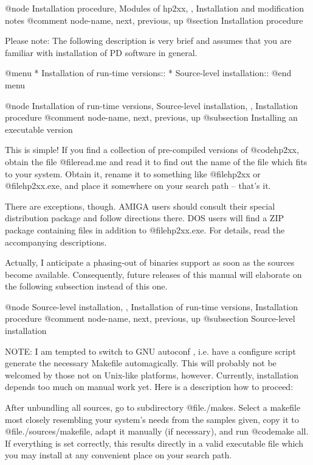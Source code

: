 @node Installation procedure, Modules of hp2xx, , Installation and modification notes
@comment  node-name,  next,  previous,  up
@section Installation procedure

Please note: The following description is very brief and assumes that you
are familiar with installation of PD software in general.

@menu
* Installation of run-time versions::
* Source-level installation::
@end menu

@node Installation of run-time versions, Source-level installation, , Installation procedure
@comment  node-name,  next,  previous,  up
@subsection Installing an executable version

This is simple! If you find a collection of pre-compiled versions of
@code{hp2xx}, obtain the file @file{read.me} and read it to find out the
name of the file which fits to your system. Obtain it, rename it to something
like @file{hp2xx} or @file{hp2xx.exe}, and place it somewhere on your
search path -- that's it.

There are exceptions, though. AMIGA users should consult their special
distribution package and follow directions there. DOS users will find a
ZIP package containing files in addition to @file{hp2xx.exe}. For details,
read the accompanying descriptions.

Actually, I anticipate a phasing-out of binaries support as soon as
the sources become available. Consequently, future releases of this
manual will elaborate on the following subsection instead of this one.



@node Source-level installation, , Installation of run-time versions, Installation procedure
@comment  node-name,  next,  previous,  up
@subsection Source-level installation

NOTE: I am tempted to switch to GNU autoconf , i.e. have a configure
script generate the necessary Makefile automagically. This will probably
not be welcomed by those not on Unix-like platforms, however.
Currently, installation depends too much
on manual work yet. Here is a description how to proceed:

After unbundling all sources, go to subdirectory @file{./makes}. Select a
makefile most closely resembling your system's needs from the samples given,
copy it to @file{./sources/makefile}, adapt it manually (if necessary),
and run @code{make all}.
If everything is set correctly, this results directly in a valid executable
file which you may install at any convenient place on your search path.

